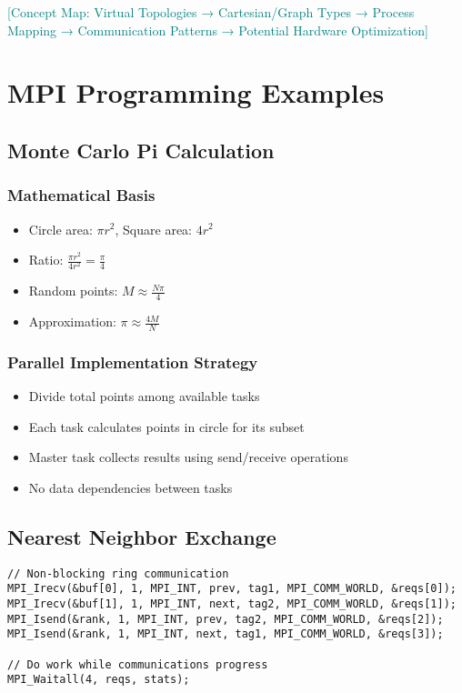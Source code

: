 \documentclass[12pt]{article}
\begin{document}
\textcolor{teal}{[Concept Map: Virtual Topologies → Cartesian/Graph Types → Process Mapping → Communication Patterns → Potential Hardware Optimization]}

\section{MPI Programming Examples}

\subsection{Monte Carlo Pi Calculation}

\subsubsection{Mathematical Basis}
\begin{itemize}
    \item Circle area: $\pi r^2$, Square area: $4r^2$
    \item Ratio: $\frac{\pi r^2}{4r^2} = \frac{\pi}{4}$
    \item Random points: $M \approx \frac{N\pi}{4}$
    \item Approximation: $\pi \approx \frac{4M}{N}$
\end{itemize}

\subsubsection{Parallel Implementation Strategy}
\begin{itemize}
    \item Divide total points among available tasks
    \item Each task calculates points in circle for its subset
    \item Master task collects results using send/receive operations
    \item No data dependencies between tasks
\end{itemize}

\subsection{Nearest Neighbor Exchange}
\begin{verbatim}
// Non-blocking ring communication
MPI_Irecv(&buf[0], 1, MPI_INT, prev, tag1, MPI_COMM_WORLD, &reqs[0]);
MPI_Irecv(&buf[1], 1, MPI_INT, next, tag2, MPI_COMM_WORLD, &reqs[1]);
MPI_Isend(&rank, 1, MPI_INT, prev, tag2, MPI_COMM_WORLD, &reqs[2]);
MPI_Isend(&rank, 1, MPI_INT, next, tag1, MPI_COMM_WORLD, &reqs[3]);

// Do work while communications progress
MPI_Waitall(4, reqs, stats);
\end{verbatim}
\end{document}
